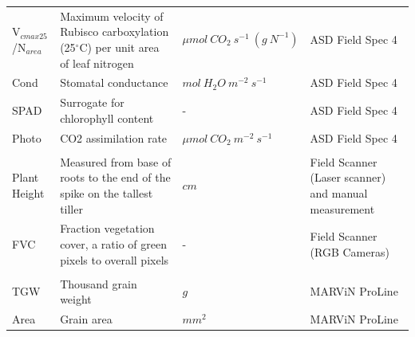 \documentclass{article}
\begin{document}
\begin{table}[ht]
\begin{adjustbox}
\begin{tabular}{@{}llll@{}}
			V$_{cmax25}$/N$_{area}$ & Maximum velocity of Rubisco carboxylation (25$^{\circ}$C) per unit area of leaf   nitrogen & ${\mu mol \ CO_{2} \ s^{-1} \ (g \ N^{-1})}$ & ASD Field Spec 4                                     \\
			Cond                    & Stomatal conductance                                                                       & ${mol \ H_{2}O \ m^{-2} \ s^{-1}}$           & ASD Field Spec 4                                     \\
			SPAD                    & Surrogate for chlorophyll content                                                          & -                                            & ASD Field Spec 4                                     \\
			Photo                   & CO2 assimilation rate                                                                      & ${\mu mol \ CO_{2} \ m^{-2} \ s^{-1}}$       & ASD Field Spec 4                                     \\
			                        &                                                                                            &                                              &                                                      \\
			Plant Height            & Measured from base of roots to the end of the spike on the tallest tiller                  & $cm$                                         & Field Scanner (Laser scanner) and manual measurement \\
			FVC                     & Fraction vegetation cover, a ratio of green pixels to overall pixels                       & -                                            & Field Scanner (RGB Cameras)                          \\
			                        &                                                                                            &                                              &                                                      \\
			TGW                     & Thousand grain weight                                                                      & $g$                                          & MARViN ProLine                                       \\
			Area                    & Grain area                                                                                 & $mm^{2}$                                     & MARViN ProLine                                       \\

\end{tabular}
\end{adjustbox}
\end{table}
\end{document}

